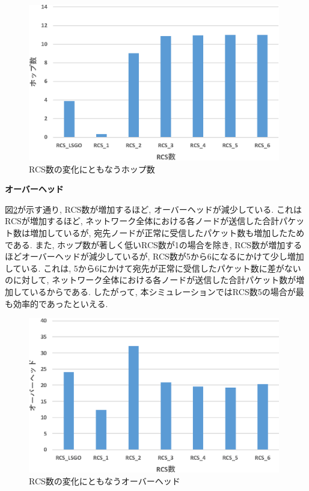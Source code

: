 \documentclass[10pt]{jreport}
\begin{document}
\begin{figure}[h]
	\centering
	\includegraphics[width=110mm]{figures/RCS_Hop.eps}
	\caption{RCS数の変化にともなうホップ数}
	\label{fig:RCS-hop}
\end{figure}



\par
\vspace{5mm}
\noindent
\textbf{オーバーヘッド}
\vspace{5mm}

図\ref{fig:RCS-overhead}が示す通り, RCS数が増加するほど, オーバーヘッドが減少している. これはRCSが増加するほど, ネットワーク全体における各ノードが送信した合計パケット数は増加しているが, 宛先ノードが正常に受信したパケット数も増加したためである. また, ホップ数が著しく低いRCS数が1の場合を除き, RCS数が増加するほどオーバーヘッドが減少しているが, RCS数が5から6になるにかけて少し増加している. これは, 5から6にかけて宛先が正常に受信したパケット数に差がないのに対して, ネットワーク全体における各ノードが送信した合計パケット数が増加しているからである. したがって, 本シミュレーションではRCS数5の場合が最も効率的であったといえる. 

\begin{figure}[!ht]
	\centering
	\includegraphics[width=110mm]{figures/RCS_Overhead.eps}
	\caption{RCS数の変化にともなうオーバーヘッド}
	\label{fig:RCS-overhead}
\end{figure}
\end{document}
